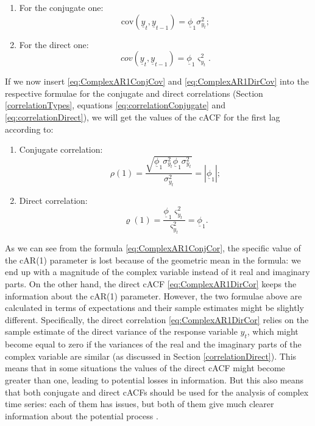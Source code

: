 \documentclass[
]{book}
\providecommand{\tightlist}{%
  \setlength{\itemsep}{0pt}\setlength{\parskip}{0pt}}
\begin{document}
\begin{enumerate}
\def\labelenumi{\arabic{enumi}.}
\tightlist
\item
  For the conjugate one:
  \begin{equation}
   \mathrm{cov}\left(\underline{y}_t, \underline{y}_{t-1} \right) = \underline{\phi}_1 \sigma^2_{y_t} ;
   \label{eq:ComplexAR1ConjCov}
  \end{equation}
\item
  For the direct one:
  \begin{equation}
   cov \left(\underline{y}_t, \underline{y}_{t-1} \right) = \underline{\phi}_1 \varsigma^2_{y_t} .
   \label{eq:ComplexAR1DirCov}
  \end{equation}
\end{enumerate}

If we now insert \eqref{eq:ComplexAR1ConjCov} and \eqref{eq:ComplexAR1DirCov} into the respective formulae for the conjugate and direct correlations (Section \ref{correlationTypes}, equations \eqref{eq:correlationConjugate} and \eqref{eq:correlationDirect}), we will get the values of the cACF for the first lag according to:

\begin{enumerate}
\def\labelenumi{\arabic{enumi}.}
\item
  Conjugate correlation:
  \begin{equation}
   \rho(1) = \frac{\sqrt{\underline{\phi}_1 \sigma^2_{y_t} \underline{\phi}_1 \sigma^2_{y_t}}}{\sigma_{y_t}^2} = | \underline{\phi}_1 |;
   \label{eq:ComplexAR1ConjCor}
  \end{equation}
\item
  Direct correlation:
  \begin{equation}
   \varrho(1) = \frac{\underline{\phi}_1 \varsigma^2_{y_t}}{\varsigma^2_{y_t}} = \underline{\phi}_1.
   \label{eq:ComplexAR1DirCor}
  \end{equation}
\end{enumerate}

As we can see from the formula \eqref{eq:ComplexAR1ConjCor}, the specific value of the cAR(1) parameter is lost because of the geometric mean in the formula: we end up with a magnitude of the complex variable instead of it real and imaginary parts. On the other hand, the direct cACF \eqref{eq:ComplexAR1DirCor} keeps the information about the cAR(1) parameter. However, the two formulae above are calculated in terms of expectations and their sample estimates might be slightly different. Specifically, the direct correlation \eqref{eq:ComplexAR1DirCor} relies on the sample estimate of the direct variance of the response variable \(y_t\), which might become equal to zero if the variances of the real and the imaginary parts of the complex variable are similar (as discussed in Section \ref{correlationDirect}). This means that in some situations the values of the direct cACF might become greater than one, leading to potential losses in information. But this also means that both conjugate and direct cACFs should be used for the analysis of complex time series: each of them has issues, but both of them give much clearer information about the potential process \citep[ provide some arguments to support this claim]{Zhou2015}.
\end{document}
